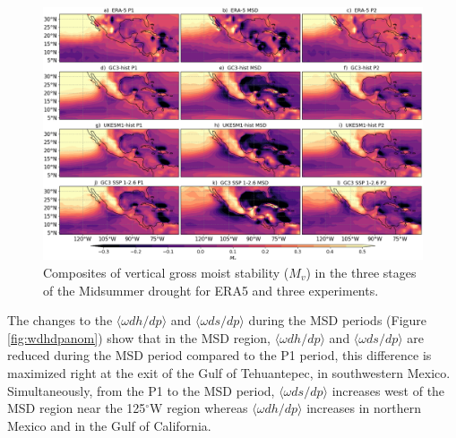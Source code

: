 \begin{figure}[t!]
\includegraphics[width=\linewidth]{figures/thermocompositeMvclim.png}
\caption[Composites of gross moist stability]{Composites of vertical gross moist stability ($M_v$) in the three stages of the Midsummer drought for ERA5 and three experiments.  }
\label{fig:Mvcompo}
\end{figure} 
 
 The changes to the $\langle \omega dh/dp \rangle$ and $\langle \omega ds/dp \rangle$ during the MSD periods (Figure \ref{fig:wdhdpanom}) show that in the MSD region, $\langle \omega dh/dp \rangle$ and $\langle \omega ds/dp \rangle$ are reduced during the MSD period compared to the P1 period, this difference is maximized right at the exit of the Gulf of Tehuantepec, in southwestern Mexico. 
 Simultaneously, from the P1 to the MSD period, $\langle \omega ds/dp \rangle$ increases west of the MSD region near the 125$^\circ$W region whereas $\langle \omega dh/dp \rangle$ increases in northern Mexico and in the Gulf of California. 
 
